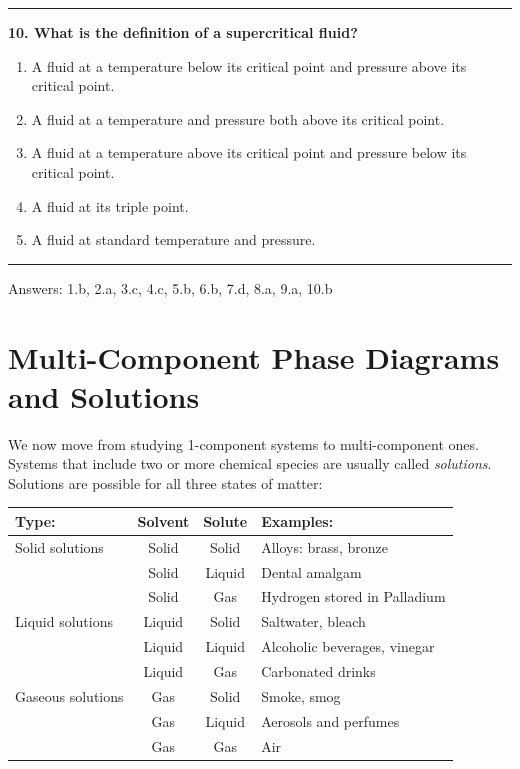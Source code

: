 \documentclass[
  9pt,
]{extbook}
\newcounter{none} %
\providecommand{\tightlist}{%
  \setlength{\itemsep}{0pt}\setlength{\parskip}{0pt}}
\theoremstyle{definition}
\theoremstyle{definition}
\theoremstyle{definition}
\theoremstyle{definition}
\theoremstyle{remark}
\begin{document}
\begin{center}\rule{0.5\linewidth}{0.5pt}\end{center}

\textbf{10. What is the definition of a supercritical fluid?}

\begin{enumerate}
\def\labelenumi{\alph{enumi}.}
\tightlist
\item
  A fluid at a temperature below its critical point and pressure above its critical point.
\item
  A fluid at a temperature and pressure both above its critical point.
\item
  A fluid at a temperature above its critical point and pressure below its critical point.
\item
  A fluid at its triple point.
\item
  A fluid at standard temperature and pressure.
\end{enumerate}

\begin{center}\rule{0.5\linewidth}{0.5pt}\end{center}

Answers: 1.b, 2.a, 3.c, 4.c, 5.b, 6.b, 7.d, 8.a, 9.a, 10.b

\renewcommand*{\standardstate}{{-\kern-6pt{\ominus}\kern-6pt-}}

\chapter{Multi-Component Phase Diagrams and Solutions}\label{MCPhaseDiagrams}

We now move from studying 1-component systems to multi-component ones. Systems that include two or more chemical species are usually called \emph{solutions}. Solutions are possible for all three states of matter:

\scriptsize

{\def\LTcaptype{none} %
\begin{longtable}[]{@{}lccl@{}}
\toprule\noalign{}
Type: & Solvent & Solute & Examples: \\
\midrule\noalign{}
\endhead
\bottomrule\noalign{}
\endlastfoot
Solid solutions & Solid & Solid & Alloys: brass, bronze \\
& Solid & Liquid & Dental amalgam \\
& Solid & Gas & Hydrogen stored in Palladium \\
Liquid solutions & Liquid & Solid & Saltwater, bleach \\
& Liquid & Liquid & Alcoholic beverages, vinegar \\
& Liquid & Gas & Carbonated drinks \\
Gaseous solutions & Gas & Solid & Smoke, smog \\
& Gas & Liquid & Aerosols and perfumes \\
& Gas & Gas & Air \\
\end{longtable}
}
\end{document}
